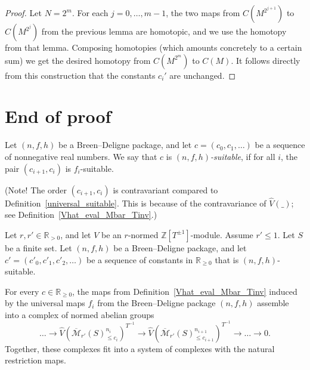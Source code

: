 \begin{proof} Let $N=2^m$. For each $j=0,\ldots,m-1$, the two maps from $C(M^{2^{j+1}})$ to $C(M^{2^j})$ from the previous lemma are homotopic, and we use the homotopy from that lemma. Composing homotopies (which amounts concretely to a certain sum) we get the desired homotopy from $C(M^{2^m})$ to $C(M)$. It follows directly from this construction that the constants $c_i'$ are unchanged.
\end{proof}

\section{End of proof}

\begin{definition}
  \label{BD_suitable}
  \leanok
  Let $(n, f, h)$ be a Breen--Deligne package,
  and let $c = (c_0, c_1, \dots)$ be a sequence of nonnegative real numbers.
  We say that $c$ is \emph{$(n,f,h)$-suitable},
  if for all $i$, the pair $(c_{i+1}, c_i)$ is $f_i$-suitable.

  (Note! The order $(c_{i+1}, c_i)$ is contravariant
  compared to Definition~\ref{universal_suitable}.
  This is because of the contravariance of $\hat V(\_)$;
  see Definition~\ref{Vhat_eval_Mbar_Tinv}.)
\end{definition}

\begin{definition}
  \label{Mbar_system}
  \leanok
  Let $r, r' \in \mathbb R_{>0}$,
  and let $V$ be an $r$-normed $\mathbb Z[T^{\pm 1}]$-module.
  Assume $r' \le 1$.
  Let $S$ be a finite set.
  Let $(n,f,h)$ be a Breen--Deligne package,
  and let $c' = (c'_0, c'_1, c'_2, \dots)$ be a sequence of constants in $\mathbb R_{\ge 0}$
  that is $(n,f,h)$-suitable.

  For every $c \in \mathbb R_{\ge 0}$,
  the maps from Definition~\ref{Vhat_eval_Mbar_Tinv}
  induced by the universal maps $f_i$ from the Breen--Deligne package $(n,f,h)$
  assemble into a complex of normed abelian groups
  \[
    \dots \to
    \hat V(\overline{\mathcal M}_{r'}(S)_{\le c_i}^{n_i})^{T^{-1}}
    \to
    \hat V(\overline{\mathcal M}_{r'}(S)_{\le c_{i+1}}^{n_{i+1}})^{T^{-1}}
    \to \dots \to 0.
  \]
  Together, these complexes fit into a system of complexes
  with the natural restriction maps.
\end{definition}

